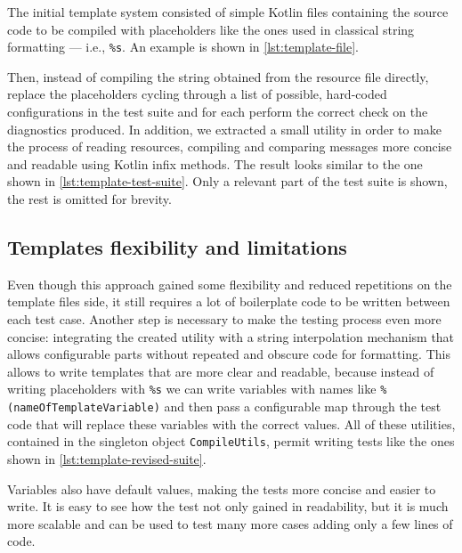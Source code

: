 \documentclass[12pt,a4paper,openright,twoside]{book}
\begin{document}
The initial template system consisted of simple Kotlin files containing the
source code to be compiled with placeholders like the ones used in classical
string formatting --- i.e., \lstinline{%s}. An example is shown in 
\cref{lst:template-file}. 
%

%
Then, instead of compiling the string obtained from the resource file directly,
replace the placeholders cycling through a list of possible, hard-coded
configurations in the test suite and for each perform the correct check on the
diagnostics produced.
%
In addition, we extracted a small utility in order to make the process of
reading resources, compiling and comparing messages more concise and readable
using Kotlin infix methods.
The result looks similar to the one shown in \cref{lst:template-test-suite}.
Only a relevant part of the test suite is shown, the rest is omitted for
brevity.



\subsection{Templates flexibility and limitations}

Even though this approach gained some flexibility and reduced repetitions on the
template files side, it still requires a lot of boilerplate code to be written
between each test case. Another step is necessary to make the testing process
even more concise: integrating the created utility with a string interpolation
mechanism that allows configurable parts without repeated and obscure code for
formatting. 
%
This allows to write templates that are more clear and readable, because instead
of writing placeholders with \lstinline{%s} we can write variables with names 
like \lstinline{%(nameOfTemplateVariable)} and then pass a configurable map 
through the test code that will replace these variables with the correct values.
All of these utilities, contained in the singleton object \lstinline{CompileUtils},
permit writing tests like the ones shown in \cref{lst:template-revised-suite}.
%

%
Variables also have default values, making the tests more concise and easier to
write. It is easy to see how the test not only gained in readability, but it is
much more scalable and can be used to test many more cases adding only a few
lines of code. 
\end{document}
